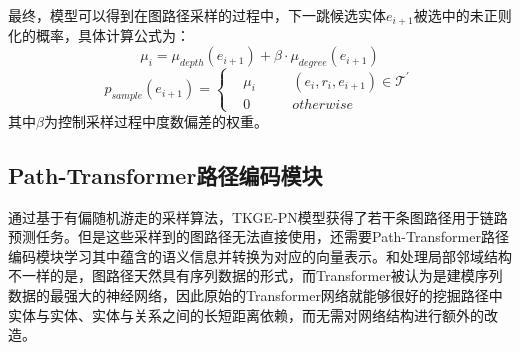最终，模型可以得到在图路径采样的过程中，下一跳候选实体$e_{i+1}$被选中的未正则化的概率，具体计算公式为：
\begin{equation}
  \mu_i = \mu_{depth}(e_{i+1})+\beta\cdot\mu_{degree}(e_{i+1})
\end{equation}
\begin{equation}
  p_{sample}(e_{i+1})=\left\{
      \begin{aligned}
          &\mu_i &&\quad (e_i,r_i,e_{i+1})\in \mathcal{T}^{\prime} \\
          &0 &&\quad otherwise
      \end{aligned}
  \right.
\end{equation}
其中$\beta$为控制采样过程中度数偏差的权重。

\subsection{Path-Transformer路径编码模块}

通过基于有偏随机游走的采样算法，TKGE-PN模型获得了若干条图路径用于链路预测任务。但是这些采样到的图路径无法直接使用，还需要Path-Transformer路径编码模块学习其中蕴含的语义信息并转换为对应的向量表示。和处理局部邻域结构不一样的是，图路径天然具有序列数据的形式，而Transformer被认为是建模序列数据的最强大的神经网络，因此原始的Transformer网络就能够很好的挖掘路径中实体与实体、实体与关系之间的长短距离依赖，而无需对网络结构进行额外的改造。

